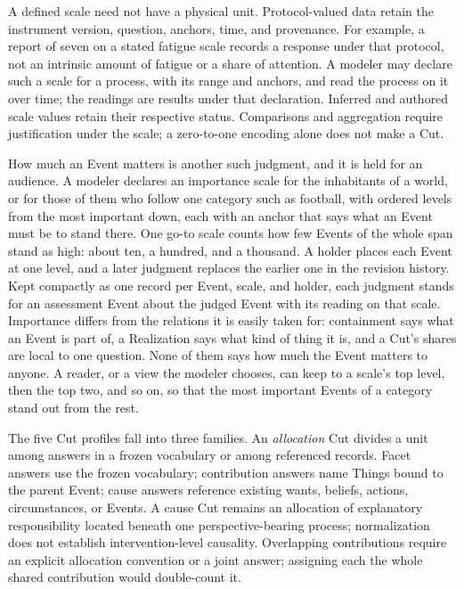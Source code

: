 \documentclass[11pt,a4paper]{article}
\begin{document}
A defined scale need not have a physical unit. Protocol-valued data retain the
instrument version, question, anchors, time, and provenance. For example, a
report of seven on a stated fatigue scale records a response under that
protocol, not an intrinsic amount of fatigue or a share of attention. A modeler
may declare such a scale for a process, with its range and anchors, and read the
process on it over time; the readings are results under that declaration. Inferred
and authored scale values retain their respective status. Comparisons and
aggregation require justification under the scale; a zero-to-one encoding
alone does not make a Cut.

How much an Event matters is another such judgment, and it is held for an
audience. A modeler declares an importance scale for the inhabitants of a
world, or for those of them who follow one category such as football, with
ordered levels from the most important down, each with an anchor that says what
an Event must be to stand there. One go-to scale counts how few Events of the
whole span stand as high: about ten, a hundred, and a thousand. A holder places
each Event at one level, and a later judgment replaces the earlier one in the
revision history. Kept compactly as one record per Event, scale, and holder,
each judgment stands for an assessment Event about the judged Event with its
reading on that scale. Importance differs from the relations it is easily taken
for: containment says what an Event is part of, a Realization says what kind of
thing it is, and a Cut's shares are local to one question. None of them says how
much the Event matters to anyone. A reader, or a view the modeler chooses, can
keep to a scale's top level, then the top two, and so on, so that the most
important Events of a category stand out from the rest.

The five Cut profiles fall into three families. An \emph{allocation} Cut
divides a unit among answers in a frozen vocabulary or among referenced records.
Facet answers use the frozen vocabulary; contribution answers name Things bound
to the parent Event; cause answers reference existing wants, beliefs, actions,
circumstances, or Events. A cause Cut remains an allocation of explanatory
responsibility located beneath one perspective-bearing process;
normalization does not establish intervention-level causality.
Overlapping contributions require an explicit allocation convention or a joint
answer; assigning each the whole shared contribution would double-count it.
\end{document}
